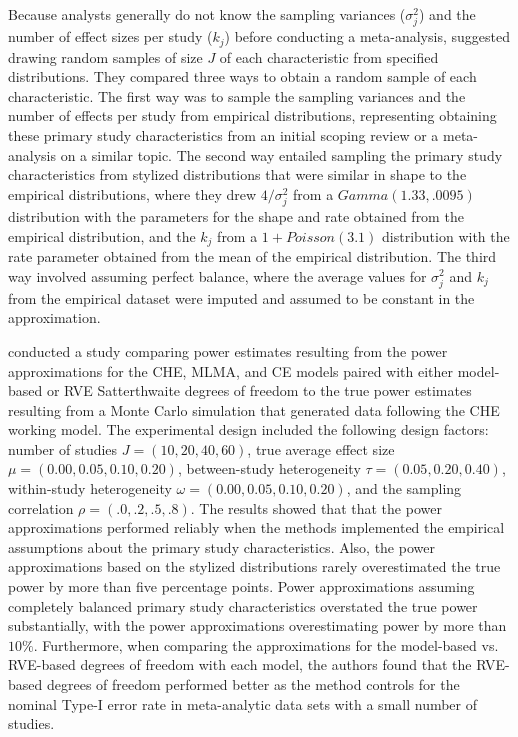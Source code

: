 Because analysts generally do not know the sampling variances ($\sigma^2_j$) and the number of effect sizes per study ($k_j$) before conducting a meta-analysis, \textcite{vembye2023} suggested drawing random samples of size $J$ of each characteristic from specified distributions. They compared three ways to obtain a random sample of each characteristic. The first way was to sample the sampling variances and the number of effects per study from empirical distributions, representing obtaining these primary study characteristics from an initial scoping review or a meta-analysis on a similar topic. The second way entailed sampling the primary study characteristics from stylized distributions that were similar in shape to the empirical distributions, where they drew $4/\sigma^2_j$ from a $Gamma(1.33, .0095)$ distribution with the parameters for the shape and rate obtained from the empirical distribution, and the $k_j$ from a $1 + Poisson(3.1)$ distribution with the rate parameter obtained from the mean of the empirical distribution. The third way involved assuming perfect balance, where the average values for $\sigma_j^2$ and $k_j$ from the empirical dataset were imputed and assumed to be constant in the approximation. 

\textcite{vembye2023} conducted a study comparing power estimates resulting from the power approximations for the CHE, MLMA, and CE models paired with either model-based or RVE Satterthwaite degrees of freedom to the true power estimates resulting from a Monte Carlo simulation that generated data following the CHE working model. The experimental design included the following design factors: number of studies $J= (10, 20, 40, 60)$, true average effect size $\mu = (0.00, 0.05, 0.10, 0.20)$, between-study heterogeneity $\tau = (0.05, 0.20, 0.40)$, within-study heterogeneity $\omega = (0.00, 0.05, 0.10, 0.20)$, and the sampling correlation $\rho = (.0, .2, .5, .8)$. The results showed that that the power approximations performed reliably when the methods implemented the empirical assumptions about the primary study characteristics. Also, the power approximations based on the stylized distributions rarely overestimated the true power by more than five percentage points. Power approximations assuming completely balanced primary study characteristics overstated the true power substantially, with the power approximations overestimating power by more than $10\%$. Furthermore, when comparing the approximations for the model-based vs. RVE-based degrees of freedom with each model, the authors found that the RVE-based degrees of freedom performed better as the method controls for the nominal Type-I error rate in meta-analytic data sets with a small number of studies. 

